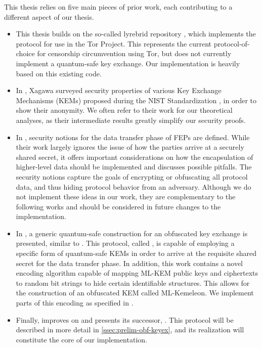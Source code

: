 This thesis relies on five main pieces of prior work, each contributing to a different aspect of our thesis.
\begin{itemize}
    \item This thesis builds on the so-called lyrebrid repository \cite{lyrebird}, which implements the \obfsfour{} protocol for use in the Tor Project. This represents the current protocol-of-choice for censorship circumvention using Tor, but does not currently implement a quantum-safe key exchange. Our implementation is heavily based on this existing code.

    \item In \cite{EC:Xagawa22}, Xagawa surveyed security properties of various Key Exchange Mechanisms (KEMs) proposed during the NIST Standardization \cite{nist-standardization}, in order to show their anonymity. We often refer to their work for our theoretical analyses, as their intermediate results greatly simplify our security proofs.

    \item In \cite{CCS:FenJoh24}, security notions for the data transfer phase of FEPs are defined. While their work largely ignores the issue of how the parties arrive at a securely shared secret, it offers important considerations on how the encapsulation of higher-level data should be implemented and discusses possible pitfalls. The security notions capture the goals of encrypting or obfuscating all protocol data, and thus hiding protocol behavior from an adversary.
    Although we do not implement these ideas in our work, they are complementary to the following works and should be considered in future changes to the implementation.

    \item In \cite{CCS:GunSteVei24}, a generic quantum-safe construction for an obfuscated key exchange is presented, similar to \obfsfour{}. This protocol, called \pqobfs{}, is capable of employing a specific form of quantum-safe KEMs in order to arrive at the requisite shared secret for the data transfer phase.
    In addition, this work contains a novel encoding algorithm capable of mapping ML-KEM public keys and ciphertexts to random bit strings to hide certain identifiable structures. This allows for the construction of an obfuscated KEM called ML-Kemeleon. We implement parts of this encoding as specified in \cite{irtf-cfrg-kemeleon-00}. 

    \item Finally, \cite{EPRINT:GRSV25} improves on \pqobfs{} and presents its successor, \drivel{}. This protocol will be described in more detail in \cref{ssec:prelim-obf-keyex}, and its realization will constitute the core of our implementation.
\end{itemize}

